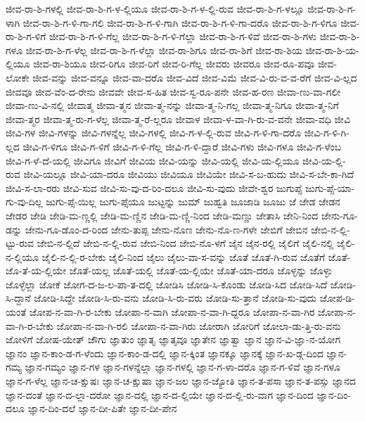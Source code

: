 {ಜೀವ-ರಾ-ಶಿ-ಗಳಲ್ಲಿ
ಜೀವ-ರಾ-ಶಿ-ಗ-ಳ-ಲ್ಲಿಯೂ
ಜೀವ-ರಾ-ಶಿ-ಗ-ಳ-ಲ್ಲಿ-ರುವ
ಜೀವ-ರಾ-ಶಿ-ಗ-ಳಲ್ಲೂ
ಜೀವ-ರಾ-ಶಿ-ಗ-ಳಾಗಿ
ಜೀವ-ರಾ-ಶಿ-ಗ-ಳಿ-ಗಾ-ಗಲಿ
ಜೀವ-ರಾ-ಶಿ-ಗ-ಳಿ-ಗಾಗಿ
ಜೀವ-ರಾ-ಶಿ-ಗ-ಳಿ-ಗಾ-ದರೊ
ಜೀವ-ರಾ-ಶಿ-ಗ-ಳಿಗೂ
ಜೀವ-ರಾ-ಶಿ-ಗ-ಳಿಗೆ
ಜೀವ-ರಾ-ಶಿ-ಗ-ಳಿ-ಗೆಲ್ಲ
ಜೀವ-ರಾ-ಶಿ-ಗ-ಳಿ-ಗೆಲ್ಲಾ
ಜೀವ-ರಾ-ಶಿ-ಗ-ಳಿವೆ
ಜೀವ-ರಾ-ಶಿ-ಗಳು
ಜೀವ-ರಾ-ಶಿ-ಗಳೂ
ಜೀವ-ರಾ-ಶಿ-ಗ-ಳೆಲ್ಲ
ಜೀವ-ರಾ-ಶಿ-ಗ-ಳೆಲ್ಲಾ
ಜೀವ-ರಾ-ಶಿಗೂ
ಜೀವ-ರಾ-ಶಿಗೆ
ಜೀವ-ರಾ-ಶಿಯ
ಜೀವ-ರಾ-ಶಿ-ಯ-ಲ್ಲಿಯೂ
ಜೀವ-ರಾ-ಶಿಯೂ
ಜೀವ-ರಿಗೂ
ಜೀವ-ರಿಗೆ
ಜೀವ-ರಿ-ಗೆಲ್ಲ
ಜೀವರು
ಜೀವರೂ
ಜೀವ-ರೂ-ಪವೂ
ಜೀವ-ಲೋಕೇ
ಜೀವ-ವನ್ನು
ಜೀವ-ವನ್ನೂ
ಜೀವ-ವಾ-ದರೊ
ಜೀವ-ವಿದೆ
ಜೀವ-ವಿಮೆ
ಜೀವ-ವಿ-ರು-ವ-ವ-ರೆಗೆ
ಜೀವ-ವಿ-ಲ್ಲದ
ಜೀವವೂ
ಜೀವ-ವೆಂ-ದ-ರೇನು
ಜೀವವೇ
ಜೀವ-ಸ-ಹಿತ
ಜೀವ-ಸ್ವ-ರೂ-ಪನೇ
ಜೀವ-ಹ-ರಣ
ಜೀವಾ-ಣು-ವಾ-ಗಲೀ
ಜೀವಾ-ಣು-ವಿ-ನಲ್ಲಿ
ಜೀವಾತ್ಮ
ಜೀವಾ-ತ್ಮನ
ಜೀವಾ-ತ್ಮ-ನನ್ನು
ಜೀವಾ-ತ್ಮ-ನಿ-ಗಲ್ಲ
ಜೀವಾ-ತ್ಮ-ನಿಗೂ
ಜೀವಾ-ತ್ಮ-ನಿಗೆ
ಜೀವಾ-ತ್ಮರ
ಜೀವಾ-ತ್ಮ-ರು-ಗ-ಳೆಲ್ಲ
ಜೀವಾ-ತ್ಮ-ರೆ-ಲ್ಲರೂ
ಜೀವಾಳ
ಜೀವಾ-ಳ-ವಾ-ಗಿ-ರು-ವ-ವನೇ
ಜೀವಾ-ವಧಿ
ಜೀವಿ
ಜೀವಿ-ಗಳ
ಜೀವಿ-ಗಳನ್ನು
ಜೀವಿ-ಗಳನ್ನೆಲ್ಲ
ಜೀವಿ-ಗಳಲ್ಲಿ
ಜೀವಿ-ಗ-ಳ-ಲ್ಲಿ-ರುವ
ಜೀವಿ-ಗ-ಳಿ-ಗಾ-ದರೊ
ಜೀವಿ-ಗ-ಳಿ-ಗಿ-ಲ್ಲದ
ಜೀವಿ-ಗ-ಳಿಗೂ
ಜೀವಿ-ಗ-ಳಿಗೆ
ಜೀವಿ-ಗ-ಳಿ-ಗೆಲ್ಲ
ಜೀವಿ-ಗ-ಳಿ-ದ್ದಾರೆ
ಜೀವಿ-ಗಳು
ಜೀವಿ-ಗಳೂ
ಜೀವಿ-ಗ-ಳೆಂಬ
ಜೀವಿ-ಗ-ಳೆ-ದೆ-ಯಲ್ಲಿ
ಜೀವಿಗೂ
ಜೀವಿಗೆ
ಜೀವಿಯ
ಜೀವಿ-ಯನ್ನು
ಜೀವಿ-ಯಲ್ಲಿ
ಜೀವಿ-ಯ-ಲ್ಲಿಯೂ
ಜೀವಿ-ಯ-ಲ್ಲಿ-ರುವ
ಜೀವಿ-ಯಲ್ಲೂ
ಜೀವಿ-ಯಾ-ದರೂ
ಜೀವಿಯು
ಜೀವಿಯೂ
ಜೀವಿಯೇ
ಜೀವಿ-ಸ-ಬ-ಹುದು
ಜೀವಿ-ಸ-ಬೇ-ಕಾ-ಗಿದೆ
ಜೀವಿ-ಸ-ಲಾ-ರರು
ಜೀವಿ-ಸುವ
ಜೀವಿ-ಸು-ವು-ದ-ರಿಂ-ದಲೂ
ಜೀವಿ-ಸು-ವುದು
ಜೀವೇ-ಶ್ವರ
ಜುಗುಪ್ಸೆ
ಜುಗು-ಪ್ಸೆ-ಯಾ-ಗು-ವು-ದಿಲ್ಲ
ಜುಗು-ಪ್ಸೆ-ಯಿಲ್ಲ
ಜುಗು-ಪ್ಸೆಯೂ
ಜುಟ್ಟನ್ನು
ಜುಮ್
ಜುಹ್ವತಿ
ಜೂಜಾಡಿ
ಜೂಜು
ಜೆ
ಜೇಡ
ಜೇಡನ
ಜೇಡರ
ಜೇಡಿ
ಜೇಡಿ-ಮ-ಣ್ಣಲ್ಲಿ
ಜೇಡಿ-ಮ-ಣ್ಣಿನ
ಜೇಡಿ-ಮ-ಣ್ಣಿ-ನಿಂದ
ಜೇಡಿ-ಮಣ್ಣು
ಜೇತಾಸಿ
ಜೇನಿ-ನಿಂದ
ಜೇನು-ಗೂ-ಡನ್ನು
ಜೇನು-ಗೂ-ಡೊಂ-ದ-ರಿಂದ
ಜೇನು-ತುಪ್ಪ
ಜೇನು-ನೊಣ
ಜೇನು-ನೊ-ಣ-ಗಳೇ
ಜೇಬಿಗೆ
ಜೇಬಿನ
ಜೇಬಿ-ನ-ಲ್ಲಿ-ಟ್ಟು-ರುವ
ಜೇಬಿ-ನ-ಲ್ಲಿದೆ
ಜೇಬಿ-ನ-ಲ್ಲಿ-ರುವ
ಜೇಬಿ-ನಿಂದ
ಜೇಬಿ-ನೊ-ಳಗೆ
ಜೈನ
ಜೈನ-ರಲ್ಲಿ
ಜೈಲಿಗೆ
ಜೈಲಿ-ನಲ್ಲಿ
ಜೈಲಿ-ನ-ಲ್ಲಿಯೂ
ಜೈಲಿ-ನ-ಲ್ಲಿ-ರ-ಬೇಕು
ಜೈಲಿ-ನಿಂದ
ಜೈಲು
ಜೈಲು-ವಾ-ಸ-ವನ್ನು
ಜೊತೆ
ಜೊತೆ-ಗಿ-ರುವ
ಜೊತೆಗೆ
ಜೊತೆ-ಜೊ-ತೆ-ಯ-ಲ್ಲಿಯೇ
ಜೊತೆ-ಯಲ್ಲ
ಜೊತೆ-ಯಲ್ಲಿ
ಜೊತೆ-ಯ-ಲ್ಲಿಯೇ
ಜೊತೆ-ಯಾ-ದರೂ
ಜೊಳ್ಳನ್ನು
ಜೊಳ್ಳು
ಜೊಳ್ಳೆಲ್ಲಾ
ಜೋಕೆ
ಜೋಗ-ದ-ಜ-ಲ-ಪಾ-ತ-ದಲ್ಲಿ
ಜೋಡಿಸಿ
ಜೋಡಿ-ಸಿ-ಕೊಂಡು
ಜೋಡಿ-ಸಿದ
ಜೋಡಿ-ಸಿದೆ
ಜೋಡಿ-ಸಿ-ದ್ದಾನೆ
ಜೋಡಿ-ಸಿದ್ದೇ
ಜೋಡಿ-ಸಿ-ರು-ವನು
ಜೋಡಿ-ಸಿ-ರು-ವರು
ಜೋಡಿ-ಸು-ತ್ತಾನೆ
ಜೋಡಿ-ಸು-ವುದು
ಜೋಪ-ಡಿ-ಯಂತೆ
ಜೋಪ-ನ-ವಾ-ಗಿ-ರ-ಬೇಕು
ಜೋಪಾ-ನ-ವಾಗಿ
ಜೋಪಾ-ನ-ವಾ-ಗಿ-ದ್ದರೂ
ಜೋಪಾ-ನ-ವಾ-ಗಿರ
ಜೋಪಾ-ನ-ವಾ-ಗಿ-ರ-ಬೇಕು
ಜೋಪಾ-ನ-ವಾ-ಗಿ-ರಲಿ
ಜೋಪಾ-ನ-ವಾ-ಗಿರು
ಜೋರಾಗಿ
ಜೋರಿಗೆ
ಜೋಲಾ-ಡು-ತ್ತಿ-ರು-ವನು
ಜೋಳಿಗೆ
ಜೋಷ-ಯೇತ್
ಜೌಗು
ಜ್ಞಾತುಂ
ಜ್ಞಾತೃ
ಜ್ಞಾತೃವೂ
ಜ್ಞಾತೇನ
ಜ್ಞಾತ್ವಾ
ಜ್ಞಾನ
ಜ್ಞಾನ-ವಿ-ಜ್ಞಾ-ನ-ಯೋಗ
ಜ್ಞಾನಂ
ಜ್ಞಾನ-ಕಾಂ-ಡ-ಗ-ಳೆಂದು
ಜ್ಞಾನ-ಕಾಂ-ಡ-ದಲ್ಲಿ
ಜ್ಞಾನ-ಕ್ಕಿಂತ
ಜ್ಞಾನಕ್ಕೂ
ಜ್ಞಾನಕ್ಕೆ
ಜ್ಞಾನ-ಖ-ಡ್ಗ-ದಿಂದ
ಜ್ಞಾನ-ಗಮ್ಯ
ಜ್ಞಾನ-ಗಮ್ಯಂ
ಜ್ಞಾನ-ಗಳ
ಜ್ಞಾನ-ಗಳನ್ನೆಲ್ಲಾ
ಜ್ಞಾನ-ಗಳಲ್ಲಿ
ಜ್ಞಾನ-ಗ-ಳಾ-ದರೊ
ಜ್ಞಾನ-ಗ-ಳಿವೆ
ಜ್ಞಾನ-ಗಳೂ
ಜ್ಞಾನ-ಗ-ಳೆಲ್ಲ
ಜ್ಞಾನ-ಚ-ಕ್ಷುಷಃ
ಜ್ಞಾನ-ಚ-ಕ್ಷುಷಾ
ಜ್ಞಾನ-ಜಲ
ಜ್ಞಾನ-ಜ್ಯೋತಿ
ಜ್ಞಾನ-ತ-ಪಸಾ
ಜ್ಞಾನ-ತ-ಪಸ್ಸು
ಜ್ಞಾನದ
ಜ್ಞಾನ-ದಂತೆ
ಜ್ಞಾನ-ದ-ಲ್ಲಾ-ದರೋ
ಜ್ಞಾನ-ದಲ್ಲಿ
ಜ್ಞಾನ-ದ-ಲ್ಲಿಯೇ
ಜ್ಞಾನ-ದ-ಲ್ಲಿ-ರು-ವಾಗ
ಜ್ಞಾನ-ದಿಂದ
ಜ್ಞಾನ-ದಿಂ-ದಲೂ
ಜ್ಞಾನ-ದಿಂ-ದಲೆ
ಜ್ಞಾನ-ದೀ-ಪಿತೇ
ಜ್ಞಾನ-ದೀ-ಪೇನ
}
